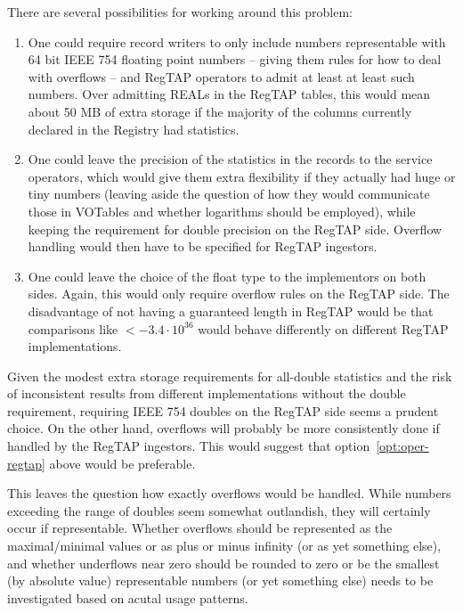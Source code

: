 \documentclass[11pt,a4paper]{ivoa}
\begin{document}
There are several possibilities for working around this problem:

\begin{enumerate}
\item One could require record writers to only include numbers
representable with 64 bit IEEE 754 floating point numbers -- giving them
rules for how to deal with overflows -- and RegTAP operators to admit
at least at least such numbers.  Over admitting REALs in the RegTAP
tables, this would mean about 50 MB of extra storage if the majority of the
columns currently declared in the Registry had statistics.

\item One could leave the precision of the statistics in the records to
the service operators, which would give them extra flexibility if they
actually had huge or tiny numbers (leaving aside the question of how
they would communicate those in VOTables and whether logarithms should
be employed), while keeping the requirement for double precision on the
RegTAP side.  Overflow handling would then have to be specified for
RegTAP ingestors.\label{opt:oper-regtap}

\item One could leave the choice of the float type to the implementors
on both sides.  Again, this would only require overflow rules on the
RegTAP side.  The disadvantage of not having a guaranteed length in RegTAP
would be that comparisons like $<-3.4\cdot 10^{36}$ would behave
differently on different RegTAP implementations.
\end{enumerate}

Given the modest extra storage requirements for all-double statistics
and the risk of inconsistent results from different implementations
without the double requirement, requiring IEEE 754 doubles on the RegTAP
side seems a prudent choice.  On the other hand, overflows will probably
be more consistently done if handled by the RegTAP ingestors.  This
would suggest that option~\ref{opt:oper-regtap} above would be
preferable.

This leaves the question how exactly overflows would be handled.  While
numbers exceeding the range of doubles seem somewhat outlandish, they
will certainly occur if representable.  Whether overflows should be
represented as the maximal/minimal values or as plus or minus infinity
(or as yet something else), and whether underflows near zero should be
rounded to zero or be the smallest (by absolute value) representable
numbers (or yet something else) needs to be investigated based on acutal
usage patterns.
\end{document}
